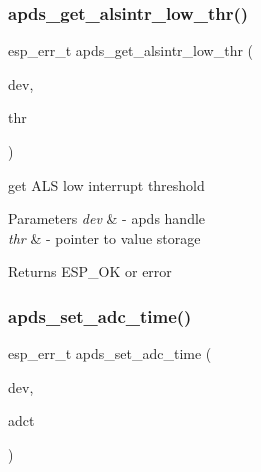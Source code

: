 \subsubsection{\texorpdfstring{apds\+\_\+get\+\_\+alsintr\+\_\+low\+\_\+thr()}{apds\_get\_alsintr\_low\_thr()}}
{\footnotesize\ttfamily esp\+\_\+err\+\_\+t apds\+\_\+get\+\_\+alsintr\+\_\+low\+\_\+thr (\begin{DoxyParamCaption}\item[{\hyperlink{structAPDS9960__Driver}{A\+P\+D\+S\+\_\+\+D\+EV}}]{dev,  }\item[{\hyperlink{vl53l0x__types_8h_a273cf69d639a59973b6019625df33e30}{uint16\+\_\+t} $\ast$}]{thr }\end{DoxyParamCaption})}




\begin{DoxyItemize}
\item get A\+LS low interrupt threshold 
\end{DoxyItemize}


\begin{DoxyParams}{Parameters}
{\em dev} & -\/ apds handle \\
\hline
{\em thr} & -\/ pointer to value storage \\
\hline
\end{DoxyParams}
\begin{DoxyReturn}{Returns}
E\+S\+P\+\_\+\+OK or error 
\end{DoxyReturn}
\mbox{\label{group__APDS9960__ALSFunctions_gaf21170ec2a4971b7c138f90eac0a26ec}} 
\subsubsection{\texorpdfstring{apds\+\_\+set\+\_\+adc\+\_\+time()}{apds\_set\_adc\_time()}}
{\footnotesize\ttfamily esp\+\_\+err\+\_\+t apds\+\_\+set\+\_\+adc\+\_\+time (\begin{DoxyParamCaption}\item[{\hyperlink{structAPDS9960__Driver}{A\+P\+D\+S\+\_\+\+D\+EV}}]{dev,  }\item[{\hyperlink{vl53l0x__types_8h_aba7bc1797add20fe3efdf37ced1182c5}{uint8\+\_\+t} $\ast$}]{adct }\end{DoxyParamCaption})}




